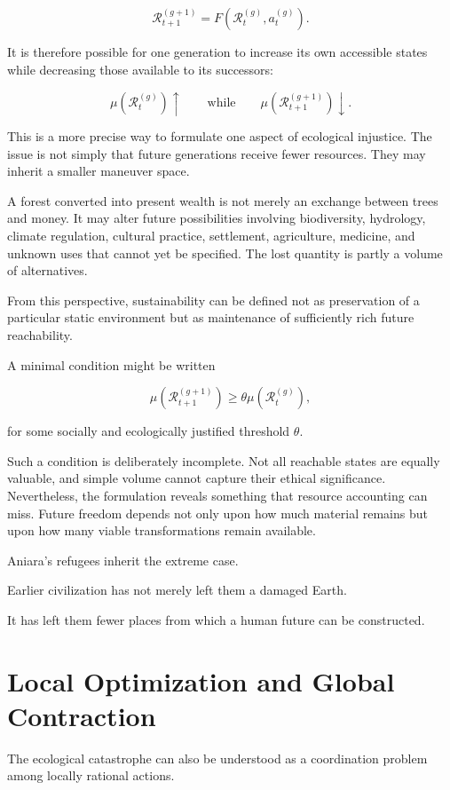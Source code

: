 \documentclass[11pt,oneside]{book}
\theoremstyle{definition}
\theoremstyle{remark}
\newcommand{\R}{\mathcal{R}}
\begin{document}
\[
\R_{t+1}^{(g+1)}
=
F\!\left(
\R_t^{(g)},
a_t^{(g)}
\right).
\]

It is therefore possible for one generation to increase its own accessible states while decreasing those available to its successors:

\[
\mu\!\left(
\R_t^{(g)}
\right)\uparrow
\qquad\text{while}\qquad
\mu\!\left(
\R_{t+1}^{(g+1)}
\right)\downarrow.
\]

This is a more precise way to formulate one aspect of ecological injustice. The issue is not simply that future generations receive fewer resources. They may inherit a smaller maneuver space.

A forest converted into present wealth is not merely an exchange between trees and money. It may alter future possibilities involving biodiversity, hydrology, climate regulation, cultural practice, settlement, agriculture, medicine, and unknown uses that cannot yet be specified. The lost quantity is partly a volume of alternatives.

From this perspective, sustainability can be defined not as preservation of a particular static environment but as maintenance of sufficiently rich future reachability.

A minimal condition might be written

\[
\mu\!\left(
\R_{t+1}^{(g+1)}
\right)
\geq
\theta
\mu\!\left(
\R_t^{(g)}
\right),
\]

for some socially and ecologically justified threshold \(\theta\).

Such a condition is deliberately incomplete. Not all reachable states are equally valuable, and simple volume cannot capture their ethical significance. Nevertheless, the formulation reveals something that resource accounting can miss. Future freedom depends not only upon how much material remains but upon how many viable transformations remain available.

Aniara's refugees inherit the extreme case.

Earlier civilization has not merely left them a damaged Earth.

It has left them fewer places from which a human future can be constructed.

\section{Local Optimization and Global Contraction}

The ecological catastrophe can also be understood as a coordination problem among locally rational actions.
\end{document}

